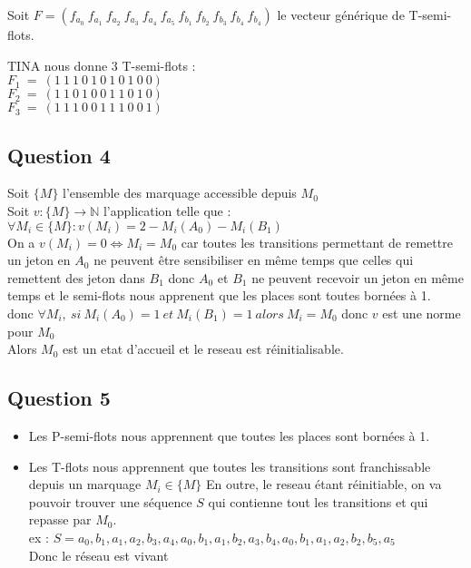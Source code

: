 Soit $F=(f_{a_0}\ f_{a_1}\ f_{a_2}\ f_{a_3}\ f_{a_4}\ f_{a_5}\ f_{b_1}\ f_{b_2}\ f_{b_3}\ f_{b_4}\ f_{b_4})$ le vecteur générique de T-semi-flots.

TINA nous donne 3 T-semi-flots :\\
$F_1\ =\ (1\ 1\ 1\ 0\ 1\ 0\ 1\ 0\ 1\ 0\ 0)$\\
$F_2\ =\ (1\ 1\ 0\ 1\ 0\ 0\ 1\ 1\ 0\ 1\ 0)$\\
$F_3\ =\ (1\ 1\ 1\ 0\ 0\ 1\ 1\ 1\ 0\ 0\ 1)$\\

\newpage

\subsection{Question 4}

Soit $\{M\}$ l'ensemble des marquage accessible depuis $M_0$\\
Soit $v : \{M\} \rightarrow \mathbb{N}$ l'application telle que :\\
$\forall M_i \in \{M\} : v(M_i) = 2-M_i(A_0)-M_i(B_1)$\\
On a $v(M_i) = 0 \Leftrightarrow M_i = M_0$ car toutes les transitions permettant de remettre un jeton en $A_0$ ne peuvent être sensibiliser en même temps que celles qui remettent des jeton dans $B_1$ donc $A_0$ et $B_1$ ne peuvent recevoir un jeton en même temps et le semi-flots nous apprenent que les places sont toutes bornées à 1.\\
donc $\forall M_i,\ si\ M_i(A_0) =1\ et\ M_i(B_1) = 1\ alors\ M_i = M_0$ 
\vspace{0.5cm}
donc $v$ est une norme pour $M_0$ \\
Alors $M_0$ est un etat d'accueil et le reseau est réinitialisable.

\subsection{Question 5}

\begin{itemize}
\item Les P-semi-flots nous apprennent que toutes les places sont bornées à 1.
\item Les T-flots nous apprennent que toutes les transitions sont franchissable depuis un marquage $M_i \in \{M\}$
En outre, le reseau étant réinitiable, on va pouvoir trouver une séquence $S$ qui contienne tout les transitions et qui repasse par $M_0$.\\
ex : $S = a_0,b_1,a_1,a_2,b_3,a_4,a_0,b_1,a_1,b_2,a_3,b_4,a_0,b_1,a_1,a_2,b_2,b_5,a_5$\\
Donc le réseau est vivant
\end{itemize}

\newpage

